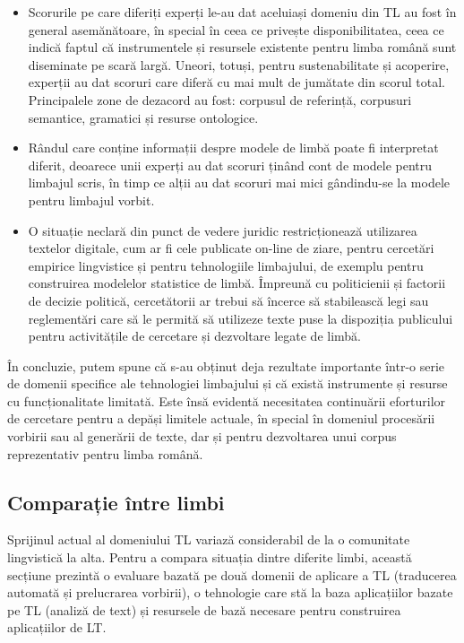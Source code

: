 \begin{multicols}{2}
\begin{itemize}
\item Scorurile pe care diferiți experți le-au dat aceluiași domeniu din TL au fost în general asemănătoare, în special în ceea ce privește disponibilitatea, ceea ce indică faptul că instrumentele și resursele existente pentru limba română sunt diseminate pe scară largă. Uneori, totuși, pentru sustenabilitate și acoperire, experții au dat scoruri care diferă cu mai mult de jumătate din scorul total. Principalele zone de dezacord au fost: corpusul de referință, corpusuri semantice, gramatici și resurse ontologice.\vspace*{-0.15 cm}
\item Rândul care conține informații despre modele de limbă poate fi interpretat diferit, deoarece unii experți au dat scoruri ținând cont de modele pentru limbajul scris, în timp ce alții au dat scoruri mai mici gândindu-se la modele pentru limbajul vorbit. 
\item O situație neclară din punct de vedere juridic restricționează utilizarea textelor digitale, cum ar fi cele publicate on-line de ziare, pentru cercetări empirice lingvistice și pentru tehnologiile limbajului, de exemplu pentru construirea modelelor statistice de limbă. Împreună cu politicienii și factorii de decizie politică, cercetătorii ar trebui să încerce să stabilească legi sau reglementări care să le permită să utilizeze texte puse la dispoziția publicului pentru activitățile de cercetare și dezvoltare legate de limbă.
\end{itemize}

În concluzie, putem spune că s-au obținut deja rezultate importante într-o serie de domenii specifice ale tehnologiei limbajului și că există instrumente și resurse cu funcționalitate limitată. Este însă evidentă necesitatea continuării eforturilor de cercetare pentru a depăși limitele actuale, în special în domeniul procesării vorbirii sau al generării de texte, dar și pentru dezvoltarea unui corpus reprezentativ pentru limba română.

\subsection{Comparație între limbi}

Sprijinul actual al domeniului TL variază considerabil de la o comunitate lingvistică la alta. Pentru a compara situația dintre diferite limbi, această secțiune prezintă o evaluare bazată pe două domenii de aplicare a TL (traducerea automată și prelucrarea vorbirii), o tehnologie care stă la baza aplicațiilor bazate pe TL (analiză de text) și resursele de bază necesare pentru construirea aplicațiilor de LT.


\end{multicols}
